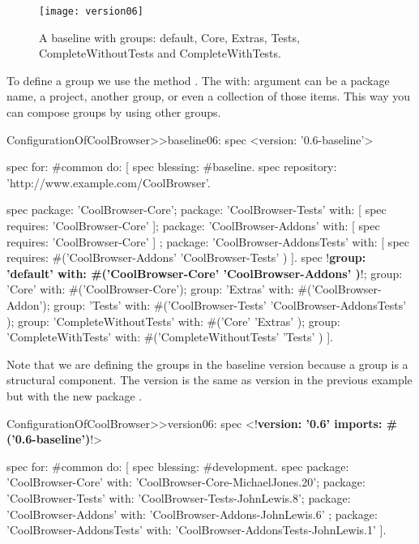\documentclass[a4paper,10pt,twoside]{book}
\begin{document}
\begin{figure}
\begin{center}
\texttt{[image: version06]}
\caption{A baseline with groups: default, Core, Extras, Tests, CompleteWithoutTests and CompleteWithTests.\label{fig:version06}}
\end{center}
\end{figure} 


To define a group we use the method . The {with:} argument can be a package name, a project, another group, or even a collection of those items. This way you can compose groups by using other groups. 
 
\begin{code}{}
ConfigurationOfCoolBrowser>>baseline06: spec 
	<version: '0.6-baseline'>
	
	spec for: #common do: [
		spec blessing: #baseline.
		spec repository: 'http://www.example.com/CoolBrowser'.
		
		spec 
			package: 'CoolBrowser-Core';
			package: 'CoolBrowser-Tests' with: [ spec requires: 'CoolBrowser-Core' ];
			package: 'CoolBrowser-Addons' with: [ spec requires: 'CoolBrowser-Core' ] ;
			package: 'CoolBrowser-AddonsTests' with: [ 
				spec requires: #('CoolBrowser-Addons' 'CoolBrowser-Tests' ) ].
		spec 
			!\textbf{group: 'default' with: \#('CoolBrowser-Core' 'CoolBrowser-Addons' )}!;
			group: 'Core' with: #('CoolBrowser-Core');
			group: 'Extras' with: #('CoolBrowser-Addon');
			group: 'Tests' with: #('CoolBrowser-Tests' 'CoolBrowser-AddonsTests' );
			group: 'CompleteWithoutTests' with: #('Core' 'Extras' );
			group: 'CompleteWithTests' with: #('CompleteWithoutTests' 'Tests' )
		 ].
\end{code}






 
Note that we are defining the groups in the baseline version because a group is a structural component. The version  is the same as version in the previous example but with the new package .
 
\begin{code}{}
ConfigurationOfCoolBrowser>>version06: spec 
	<!\textbf{version: '0.6' imports: \#('0.6-baseline')}!>
	
	spec for: #common do: [
		spec blessing: #development.
		spec 
			package: 'CoolBrowser-Core' with: 'CoolBrowser-Core-MichaelJones.20';
			package: 'CoolBrowser-Tests' with: 'CoolBrowser-Tests-JohnLewis.8';
			package: 'CoolBrowser-Addons' with: 'CoolBrowser-Addons-JohnLewis.6' ;
			package: 'CoolBrowser-AddonsTests' with: 'CoolBrowser-AddonsTests-JohnLewis.1' ].
\end{code}
 
\end{document}
